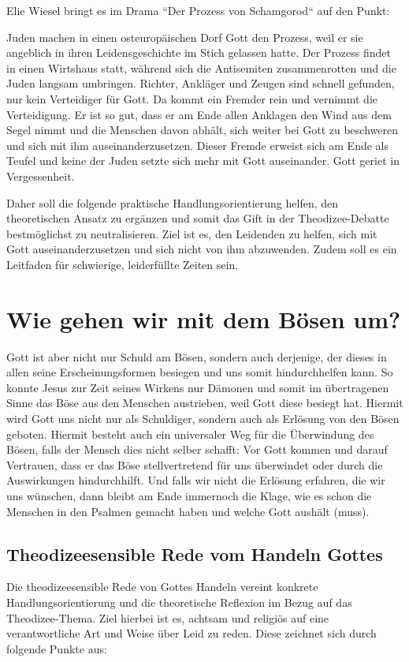 Elie Wiesel bringt es im Drama ``Der Prozess von Schamgorod`` auf den Punkt:
\begin{displayquote}
Juden machen in einen osteuropäischen Dorf Gott den Prozess, weil er sie angeblich in ihren Leidensgeschichte im Stich gelassen hatte. Der Prozess findet in einen Wirtshaus statt, während sich die Antisemiten zusammenrotten und die Juden langsam umbringen. Richter, Ankläger und Zeugen sind schnell gefunden, nur kein Verteidiger für Gott. Da kommt ein Fremder rein und vernimmt die Verteidigung. Er ist so gut, dass er am Ende allen Anklagen den Wind aus dem Segel nimmt und die Menschen  davon abhält, sich weiter bei Gott zu beschweren und sich mit ihm auseinanderzusetzen. Dieser Fremde erweist sich am Ende als Teufel und keine der Juden setzte sich mehr mit Gott auseinander. Gott geriet in Vergessenheit.
\end{displayquote}

Daher soll die folgende praktische Handlungsorientierung helfen, den theoretischen Ansatz zu ergänzen und somit das Gift in der Theodizee-Debatte bestmöglichst zu neutralisieren. Ziel ist es, den Leidenden zu helfen, sich mit Gott auseinanderzusetzen und sich nicht von ihm abzuwenden. Zudem soll es ein Leitfaden für schwierige, leiderfüllte Zeiten sein.

\section{Wie gehen wir mit dem Bösen um?}
Gott ist aber nicht nur Schuld am Bösen, sondern auch derjenige, der dieses in allen seine Erscheinungsformen besiegen
und uns somit hindurchhelfen kann. So konnte Jesus zur Zeit seines Wirkens nur Dämonen und somit im übertragenen Sinne
das Böse aus den Menschen austrieben, weil Gott diese besiegt hat. Hiermit wird Gott uns nicht nur als Schuldiger,
sondern auch als Erlösung von den Bösen geboten. Hiermit besteht auch ein universaler Weg für die Überwindung des
Bösen, falls der Mensch dies nicht selber schafft: Vor Gott kommen und darauf Vertrauen, dass er das Böse
stellvertretend für uns überwindet oder durch die Auswirkungen hindurchhilft. Und falls wir nicht die Erlösung
erfahren, die wir uns wünschen, dann bleibt am Ende immernoch die Klage, wie es schon die Menschen in den Psalmen
gemacht haben und welche Gott aushält (muss).


\subsection{Theodizeesensible Rede vom Handeln Gottes}
Die theodizeesensible Rede von Gottes Handeln vereint konkrete Handlungsorientierung und die theoretische Reflexion im Bezug auf das Theodizee-Thema. Ziel hierbei ist es, achtsam und religiös auf eine verantwortliche Art und Weise über Leid zu reden. Diese zeichnet sich durch folgende Punkte aus:

